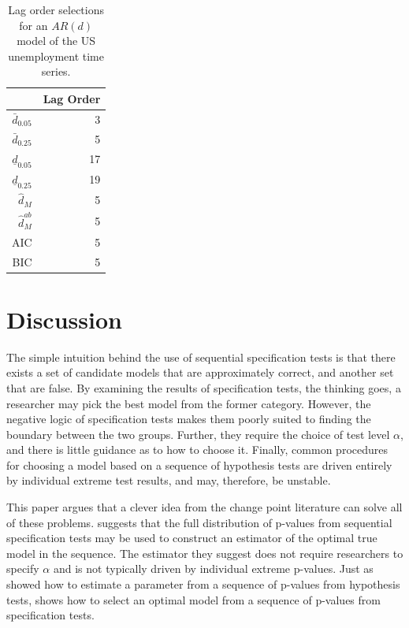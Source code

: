 \documentclass[lineno]{biometrika}\usepackage[]{graphicx}\usepackage[]{color}
\newcommand{\dhatm}{\hat{d}_M}
\newcommand{\dhatmab}{\hat{d}^{ab}_M}
\begin{document}
\begin{table}[ht]
\centering
\begin{tabular}{rr}
  \hline
 & Lag Order \\
  \hline
$\bar{d}_{0.05}$ &   3 \\
  $\bar{d}_{0.25}$ &   5 \\
  $\underline{d}_{0.05}$ &  17 \\
  $\underline{d}_{0.25}$ &  19 \\
  $\dhatm$ &   5 \\
  $\dhatmab$ &   5 \\
  AIC &   5 \\
  BIC &   5 \\
   \hline
\end{tabular}
\caption{Lag order selections for an $AR(d)$ model of the US unemployment time series.}
\label{tab:ts}
\end{table}


\section{Discussion}\label{sec:discussion}
The simple intuition behind the use of sequential specification tests is that there exists a set
of candidate models that are approximately correct, and another set
that are false.
By examining the results of specification tests, the thinking goes, a
researcher may pick the best model from the former category.
However, the negative logic of specification tests makes them poorly
suited to finding the boundary between the two groups.
Further, they require the choice of test level
$\alpha$, and there is little guidance as to how to choose it.
Finally, common procedures for choosing a model based on a sequence of
hypothesis tests are driven entirely by individual extreme test
results, and may, therefore, be unstable.

This paper argues that a clever idea from the change point literature
can solve all of these problems.
\citet{mallik} suggests that the full distribution of p-values from
sequential specification tests may be used to construct an estimator of the optimal true model
in the sequence.
The estimator they suggest does not require researchers to specify
$\alpha$ and is not typically driven by individual extreme p-values.
Just as \citet{hodgeslehmann} showed how to estimate a parameter from
a sequence of p-values from hypothesis tests, \citet{mallik} shows how
to select an optimal model from a sequence of p-values from
specification tests.
\end{document}
